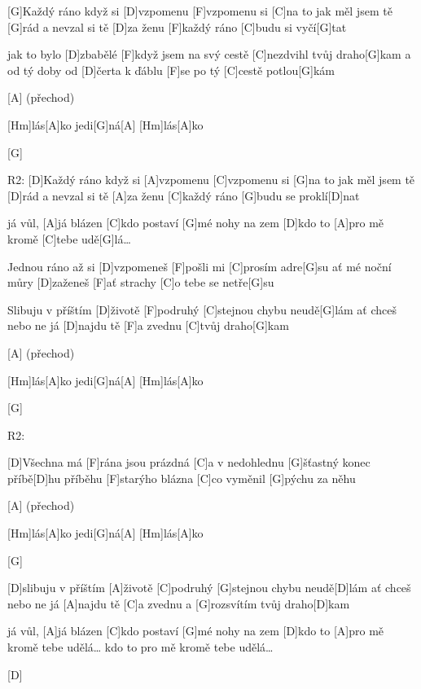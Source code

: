 
[G]Každý ráno když si [D]vzpomenu
[F]vzpomenu si [C]na to jak měl jsem tě [G]rád
a nevzal si tě [D]za ženu
[F]každý ráno [C]budu si vyčí[G]tat

jak to bylo [D]zbabělé
[F]když jsem na svý cestě [C]nezdvihl tvůj draho[G]kam
a od tý doby od [D]čerta k ďáblu
[F]se po tý [C]cestě potlou[G]kám

[A] (přechod)

[Hm]lás[A]ko
jedi[G]ná[A]
[Hm]lás[A]ko

[G]

R2: [D]Každý ráno když si [A]vzpomenu
[C]vzpomenu si [G]na to jak měl jsem tě [D]rád
a nevzal si tě [A]za ženu
[C]každý ráno [G]budu se proklí[D]nat

já vůl, [A]já blázen
[C]kdo postaví [G]mé nohy na zem
[D]kdo to [A]pro mě kromě [C]tebe udě[G]lá…

Jednou ráno až si [D]vzpomeneš
[F]pošli mi [C]prosím adre[G]su
ať mé noční můry [D]zaženeš
[F]ať strachy [C]o tebe se netře[G]su

Slibuju v příštím [D]životě
[F]podruhý [C]stejnou chybu neudě[G]lám
ať chceš nebo ne já [D]najdu tě
[F]a zvednu [C]tvůj draho[G]kam

[A] (přechod)

[Hm]lás[A]ko
jedi[G]ná[A]
[Hm]lás[A]ko

[G]

R2:

[D]Všechna má [F]rána jsou prázdná
[C]a v nedohlednu [G]šťastný konec příbě[D]hu
příběhu [F]starýho blázna
[C]co vyměnil [G]pýchu za něhu

[A] (přechod)

[Hm]lás[A]ko
jedi[G]ná[A]
[Hm]lás[A]ko

[G]

[D]slibuju v příštím [A]životě
[C]podruhý [G]stejnou chybu neudě[D]lám
ať chceš nebo ne já [A]najdu tě
[C]a zvednu a [G]rozsvítím tvůj draho[D]kam

já vůl, [A]já blázen
[C]kdo postaví [G]mé nohy na zem
[D]kdo to [A]pro mě kromě tebe udělá…
kdo to pro mě kromě tebe udělá…

[D]